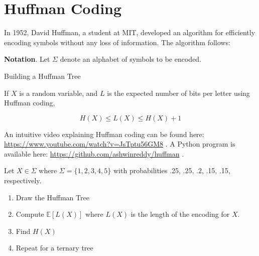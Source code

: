 \documentclass[13pt,oneside]{tufte-book}
\providecommand{\tightlist}{%
  \setlength{\itemsep}{0pt}\setlength{\parskip}{0pt}}
\theoremstyle{definition}
\theoremstyle{definition}
\theoremstyle{definition}
\theoremstyle{remark}
\let\BeginKnitrBlock\begin \let\EndKnitrBlock\end
\begin{document}
\section{Huffman Coding}\label{huffman-coding}

In 1952, David Huffman, a student at MIT, developed an algorithm for
efficiently encoding symbols without any loss of information. The
algorithm follows:

\begin{marginfigure}
\textbf{Notation}. Let \(\Sigma\) denote an alphabet of symbols to be
encoded.
\end{marginfigure}

\begin{algorithm}[H]
    \SetAlgoLined
\caption{Building a Huffman Tree}
\end{algorithm}

\BeginKnitrBlock{theorem}[Huffman Coding Optimality]
\protect\hypertarget{thm:huffman-optimality}{}{\label{thm:huffman-optimality}
{} } If \(X\) is a random
variable, and \(L\) is the expected number of bits per letter using
Huffman coding,

\[
H(X) \leq L(X) \leq H(X)+1
\]
\EndKnitrBlock{theorem}

An intuitive video explaining Huffman coding can be found here:
\url{https://www.youtube.com/watch?v=JsTptu56GM8} . A Python program is
available here: \url{https://github.com/ashwinreddy/huffman} .

\BeginKnitrBlock{example}
\protect\hypertarget{exm:unnamed-chunk-66}{}{\label{exm:unnamed-chunk-66} }
Let \(X \in \Sigma\) where \(\Sigma = \{1,2,3,4,5\}\) with probabilities
.25, .25, .2, .15, .15, respectively.

\begin{enumerate}
\def\labelenumi{\alph{enumi})}
\tightlist
\item
  Draw the Huffman Tree
\item
  Compute \(\mathbb{E}[L(X)]\) where \(L(X)\) is the length of the
  encoding for \(X\).
\item
  Find \(H(X)\)
\item
  Repeat for a ternary tree
\end{enumerate}
\EndKnitrBlock{example}
\end{document}
